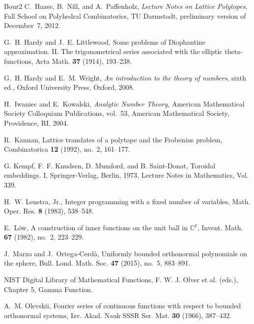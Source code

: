 \documentclass[a4paper,reqno,12pt]{amsart}
\theoremstyle{plain}
\theoremstyle{plain}
\theoremstyle{remark}
\theoremstyle{plain}
\theoremstyle{plain}
\theoremstyle{plain}
\begin{document}
{\begin{thebibliography}{Bour2}
{
C.~Haase, B.~Nill, and A.~Paffenholz,
\emph{Lecture Notes on Lattice Polytopes},
Fall School on Polyhedral Combinatorics, TU Darmstadt,
preliminary version of December~7, 2012.
}

{
G.~H. Hardy and J.~E. Littlewood,
Some problems of Diophantine approximation. II. The trigonometrical
series associated with the elliptic theta-functions,
Acta Math. \textbf{37} (1914), 193--238.
}

G.~H. Hardy and E.~M. Wright,
\emph{An introduction to the theory of numbers},
sixth ed., Oxford University Press, Oxford, 2008.



 

H.~Iwaniec and E.~Kowalski,
\emph{Analytic Number Theory},
American Mathematical Society Colloquium Publications, vol.~53,
American Mathematical Society, Providence, RI, 2004.

R.~Kannan,
Lattice translates of a polytope and the Frobenius problem,
Combinatorica \textbf{12} (1992), no.~2, 161--177.

G. Kempf, F. F. Knudsen, D. Mumford, and B. Saint-Donat, Toroidal embeddings.
I, Springer-Verlag, Berlin, 1973, Lecture Notes in Mathematics, Vol. 339.




H.~W. Lenstra, Jr.,
Integer programming with a fixed number of variables,
Math. Oper. Res. \textbf{8} (1983), 538--548.

{
E.~L\"ow,
A construction of inner functions on the unit ball in $\mathbb C^p$,
Invent. Math. \textbf{67} (1982), no.~2, 223--229.
}

{
J.~Marzo and J.~Ortega-Cerd\`a,
Uniformly bounded orthonormal polynomials on the sphere,
Bull. Lond. Math. Soc. \textbf{47} (2015), no.~5, 883--891.
}

NIST Digital Library of Mathematical Functions,
F. W. J. Olver et al. (eds.), Chapter 5, Gamma Function.

A.~M. Olevskii, Fourier series of continuous functions with respect to
bounded orthonormal systems, Izv. Akad. Nauk SSSR Ser. Mat. \textbf{30}
(1966), 387--432.


\end{thebibliography}}
\end{document}
